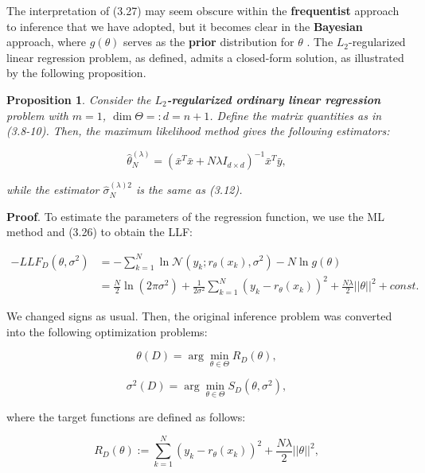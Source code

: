 \documentclass{report}
\newtheorem{proposition}{Proposition}[chapter]
\begin{document}
The interpretation of (3.27) may seem obscure within the \textbf{frequentist} approach to inference that we have adopted, but it becomes clear in the \textbf{Bayesian} approach, where $g(\theta)$ serves as the \textbf{prior} distribution for $\theta$ . The $L_2$-regularized linear regression problem, as defined, admits a closed-form solution, as illustrated by the following proposition.

\begin{proposition}
Consider the \textbf{$L_2$-regularized ordinary linear regression} problem with $m=1$, $\dim \Theta =: d = n + 1$. Define the matrix quantities as in (3.8-10). Then, the maximum likelihood method gives the following estimators:

\begin{equation}
\hat{\theta}_N^{(\lambda)} = (\bar{x}^T\bar{x} +N\lambda I_{d\times d})^{-1}\bar{x}^T\bar{y},
\end{equation}

while the estimator $\hat{\sigma}_N^{(\lambda)2}$ is the same as (3.12).
\end{proposition}

\textbf{Proof}. To estimate the parameters of the regression function, we use the ML method and (3.26) to obtain the LLF:

\begin{equation}
\begin{split}
-LLF_{D}(\theta,\sigma^2)&=-\sum_{k=1}^N\ln\mathcal{N}(y_k;r_\theta(x_k),\sigma^2) - N\ln g(\theta)\\
&=\frac{N}{2}\ln(2\pi\sigma^2)+\frac{1}{2\sigma^2}\sum_{k=1}^N(y_k-r_\theta(x_k))^2+\frac{N\lambda}{2}||\theta||^2 + const.
\end{split}
\end{equation}

We changed signs as usual. Then, the original inference problem was converted into the following optimization problems:

\begin{equation}
\theta(D) = \arg\min_{\theta \in \Theta} R_{D}(\theta),
\end{equation}

\begin{equation}
\sigma^2(D) = \arg\min_{\theta \in \Theta} S_{D}(\theta,\sigma^2),
\end{equation}

where the target functions are defined as follows:

\begin{equation}
R_{D}(\theta) :=\sum_{k=1}^N(y_k-r_\theta(x_k))^2 + \frac{N\lambda}{2}||\theta||^2,
\end{equation}
\end{document}
